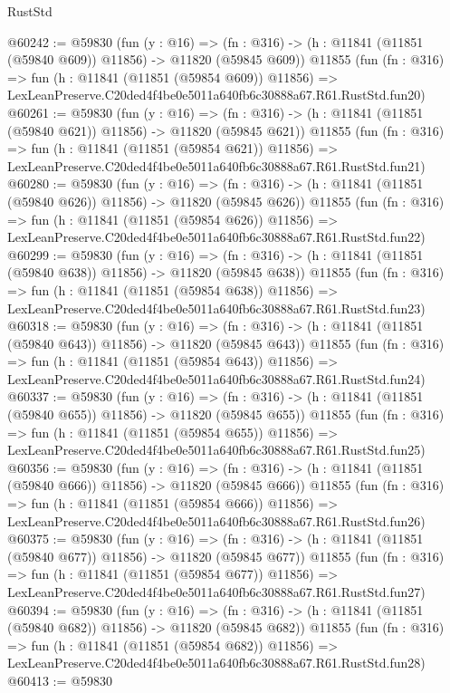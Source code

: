\begin{lexlean}{RustStd}
\begin{coremodule}
@60242 := @59830
    (fun (y : @16) =>
    (fn : @316) -> (h : @11841 (@11851 (@59840 @609)) @11856) -> @11820 (@59845 @609))
    @11855
    (fun (fn : @316) =>
    fun (h : @11841 (@11851 (@59854 @609)) @11856) =>
    LexLeanPreserve.C20ded4f4be0e5011a640fb6c30888a67.R61.RustStd.fun20)
@60261 := @59830
    (fun (y : @16) =>
    (fn : @316) -> (h : @11841 (@11851 (@59840 @621)) @11856) -> @11820 (@59845 @621))
    @11855
    (fun (fn : @316) =>
    fun (h : @11841 (@11851 (@59854 @621)) @11856) =>
    LexLeanPreserve.C20ded4f4be0e5011a640fb6c30888a67.R61.RustStd.fun21)
@60280 := @59830
    (fun (y : @16) =>
    (fn : @316) -> (h : @11841 (@11851 (@59840 @626)) @11856) -> @11820 (@59845 @626))
    @11855
    (fun (fn : @316) =>
    fun (h : @11841 (@11851 (@59854 @626)) @11856) =>
    LexLeanPreserve.C20ded4f4be0e5011a640fb6c30888a67.R61.RustStd.fun22)
@60299 := @59830
    (fun (y : @16) =>
    (fn : @316) -> (h : @11841 (@11851 (@59840 @638)) @11856) -> @11820 (@59845 @638))
    @11855
    (fun (fn : @316) =>
    fun (h : @11841 (@11851 (@59854 @638)) @11856) =>
    LexLeanPreserve.C20ded4f4be0e5011a640fb6c30888a67.R61.RustStd.fun23)
@60318 := @59830
    (fun (y : @16) =>
    (fn : @316) -> (h : @11841 (@11851 (@59840 @643)) @11856) -> @11820 (@59845 @643))
    @11855
    (fun (fn : @316) =>
    fun (h : @11841 (@11851 (@59854 @643)) @11856) =>
    LexLeanPreserve.C20ded4f4be0e5011a640fb6c30888a67.R61.RustStd.fun24)
@60337 := @59830
    (fun (y : @16) =>
    (fn : @316) -> (h : @11841 (@11851 (@59840 @655)) @11856) -> @11820 (@59845 @655))
    @11855
    (fun (fn : @316) =>
    fun (h : @11841 (@11851 (@59854 @655)) @11856) =>
    LexLeanPreserve.C20ded4f4be0e5011a640fb6c30888a67.R61.RustStd.fun25)
@60356 := @59830
    (fun (y : @16) =>
    (fn : @316) -> (h : @11841 (@11851 (@59840 @666)) @11856) -> @11820 (@59845 @666))
    @11855
    (fun (fn : @316) =>
    fun (h : @11841 (@11851 (@59854 @666)) @11856) =>
    LexLeanPreserve.C20ded4f4be0e5011a640fb6c30888a67.R61.RustStd.fun26)
@60375 := @59830
    (fun (y : @16) =>
    (fn : @316) -> (h : @11841 (@11851 (@59840 @677)) @11856) -> @11820 (@59845 @677))
    @11855
    (fun (fn : @316) =>
    fun (h : @11841 (@11851 (@59854 @677)) @11856) =>
    LexLeanPreserve.C20ded4f4be0e5011a640fb6c30888a67.R61.RustStd.fun27)
@60394 := @59830
    (fun (y : @16) =>
    (fn : @316) -> (h : @11841 (@11851 (@59840 @682)) @11856) -> @11820 (@59845 @682))
    @11855
    (fun (fn : @316) =>
    fun (h : @11841 (@11851 (@59854 @682)) @11856) =>
    LexLeanPreserve.C20ded4f4be0e5011a640fb6c30888a67.R61.RustStd.fun28)
@60413 := @59830

\end{coremodule}
\end{lexlean}

